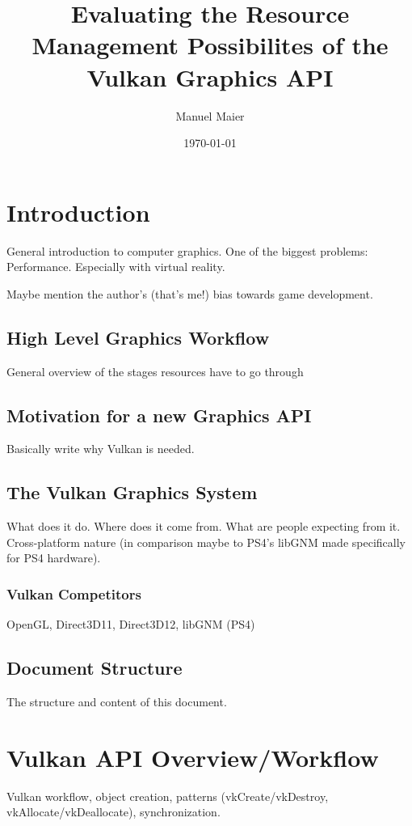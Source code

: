 \documentclass[draft,12pt]{report}
\title{Evaluating the Resource Management Possibilites of the Vulkan Graphics API}
\date{\today}
\author{Manuel Maier}
\begin{document}
  \maketitle
  \newpage

  \tableofcontents
  \newpage




  \chapter{Introduction}
    General introduction to computer graphics. One of the biggest problems: Performance. Especially with virtual reality.

    Maybe mention the author's (that's me!) bias towards game development.

    \section{High Level Graphics Workflow}
      General overview of the stages resources have to go through

    \section{Motivation for a new Graphics API}
      Basically write why Vulkan is needed.

    \section{The Vulkan Graphics System}
      What does it do. Where does it come from. What are people expecting from it. Cross-platform nature (in comparison maybe to PS4's libGNM made specifically for PS4 hardware).

      \subsection{Vulkan Competitors}
        OpenGL, Direct3D11, Direct3D12, libGNM (PS4)

    \section{Document Structure}
      The structure and content of this document.

  \chapter{Vulkan API Overview/Workflow}
    Vulkan workflow, object creation, patterns (vkCreate/vkDestroy, vkAllocate/vkDeallocate), synchronization.
\end{document}
